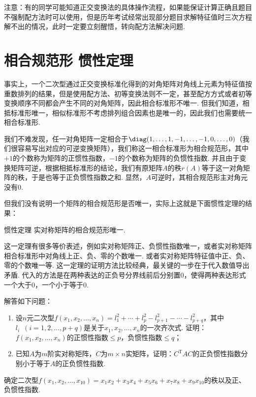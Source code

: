 注意：有的同学可能知道正交变换法的具体操作流程，如果能保证计算正确且题目不强制配方法时可以使用，但是历年考试经常出现部分题目求解特征值时三次方程解不出的情况，此时一定要立刻醒悟，转向配方法解决问题.

\section{相合规范形 \quad 惯性定理}

事实上，一个二次型通过正交变换标准化得到的对角矩阵对角线上元素为特征值按重数排列的结果，但是使用配方法、初等变换法则不一定，甚至配方方式或者初等变换顺序不同都会产生不同的对角矩阵，因此相合标准形不唯一. 但我们知道，相抵标准形唯一，相似标准形不考虑排列组合因素也是唯一的，因此我们也需要统一相合标准形.

我们不难发现，任一对角矩阵一定相合于$\diag(1,\ldots,1,-1,\ldots,-1,0,\ldots,0)$（我们很容易写出对应的可逆变换矩阵），我们称这一相合标准形为相合规范形，其中$+1$的个数称为矩阵的正惯性指数，$-1$的个数称为矩阵的负惯性指数. 并且由于变换矩阵可逆，根据相抵标准形的结论，我们有原矩阵$A$的秩$r(A)$等于这一对角矩阵的秩，于是也等于正负惯性指数之和. 显然，$A$可逆时，其相合规范形主对角元没有0.

但我们没有说明一个矩阵的相合规范形是否唯一，实际上这就是下面惯性定理的结果：
\begin{theorem}{惯性定理}{}
    实对称矩阵的相合规范形唯一.
\end{theorem}
这一定理有很多等价表述，例如实对称矩阵正、负惯性指数唯一，或者实对称矩阵相合标准形中对角线上正、负、零的个数唯一. 或者实对称矩阵特征值中正、负、零的个数唯一等. 这一定理的证明方法比较经典，最关键的一步在于代入数值导出矛盾. 代入的方法是在两种表达的正负号分界线前后分别置0，使得两种表达形式一个大于0，一个小于等于0.
\begin{example}{}{}
    解答如下问题：
    \begin{enumerate}
        \item 设$n$元二次型$f(x_1,x_2,\ldots,x_n)=l_1^2+\cdots+l_p^2-l_{p+1}^2-\cdots-l_{p+q}^2$，其中$l_i\enspace (i=1,2,\ldots,p+q)$是关于$x_1,x_2,\ldots,x_n$的一次齐次式. 证明：$f(x_1,x_2,\ldots,x_n)$的正惯性指数$\leqslant p$，负惯性指数$\leqslant q$；

        \item 已知$A$为$m$阶实对称矩阵，$C$为$m\times n$实矩阵，证明：$C^\mathrm{T}AC$的正负惯性指数分别小于等于$A$的正负惯性指数.
    \end{enumerate}
\end{example}

\begin{example}{}{}
    确定二次型$f(x_1,x_2,\ldots,x_{10})=x_1x_2+x_3x_4+x_5x_6+x_7x_8+x_9x_{10}$的秩以及正、负惯性指数.
\end{example}

